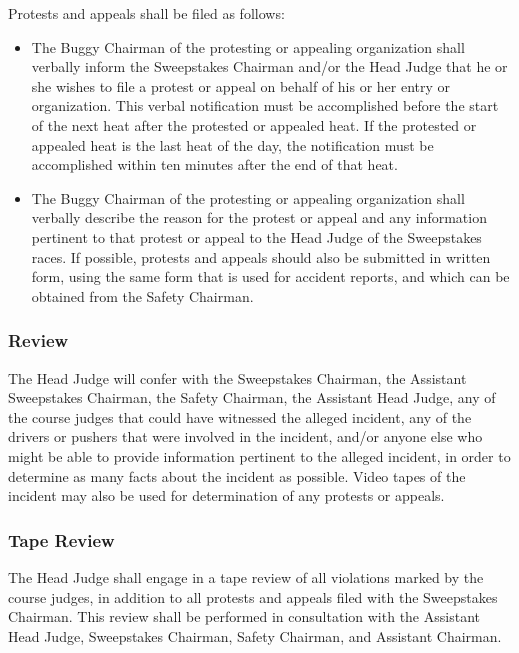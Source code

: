 	Protests and appeals shall be filed as follows:

	\begin{itemize}

		\item
		The Buggy Chairman of the protesting or appealing organization shall verbally
		inform the Sweepstakes Chairman and/or the Head Judge that he or she wishes to
		file a protest or appeal on behalf of his or her entry or organization. This
		verbal notification must be accomplished before the start of the next heat
		after the protested or appealed heat. If the protested or appealed heat is the
		last heat of the day, the notification must be accomplished within ten minutes
		after the end of that heat.

		\item
		The Buggy Chairman of the protesting or appealing organization shall verbally
		describe the reason for the protest or appeal and any information pertinent to
		that protest or appeal to the Head Judge of the Sweepstakes races. If possible,
		protests and appeals should also be submitted in written form, using the same
		form that is used for accident reports, and which can be obtained from the
		Safety Chairman.

	\end{itemize}

\subsubsection{Review}

	The Head Judge will confer with the Sweepstakes Chairman, the Assistant
	Sweepstakes Chairman, the Safety Chairman, the Assistant Head Judge, any of the
	course judges that could have witnessed the alleged incident, any of the
	drivers or pushers that were involved in the incident, and/or anyone else who
	might be able to provide information pertinent to the alleged incident, in
	order to determine as many facts about the incident as possible. Video
	tapes of the incident may also be used for determination of any protests 
	or appeals.
	
\subsubsection{Tape Review}

	The Head Judge shall engage in a tape review of all violations marked by the
	course judges, in addition to all protests and appeals filed with the
	Sweepstakes Chairman. This review shall be performed in	consultation with the 
	Assistant Head Judge, Sweepstakes Chairman, Safety Chairman, and Assistant 
	Chairman.
	

